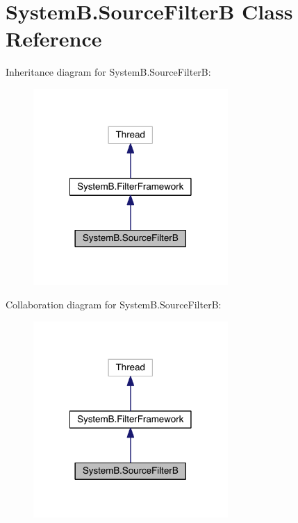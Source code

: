 \hypertarget{class_system_b_1_1_source_filter_b}{}\section{System\+B.\+Source\+Filter\+B Class Reference}
\label{class_system_b_1_1_source_filter_b}


Inheritance diagram for System\+B.\+Source\+Filter\+B\+:
\nopagebreak
\begin{figure}[H]
\begin{center}
\leavevmode
\includegraphics[width=210pt]{class_system_b_1_1_source_filter_b__inherit__graph}
\end{center}
\end{figure}


Collaboration diagram for System\+B.\+Source\+Filter\+B\+:
\nopagebreak
\begin{figure}[H]
\begin{center}
\leavevmode
\includegraphics[width=210pt]{class_system_b_1_1_source_filter_b__coll__graph}
\end{center}
\end{figure}
